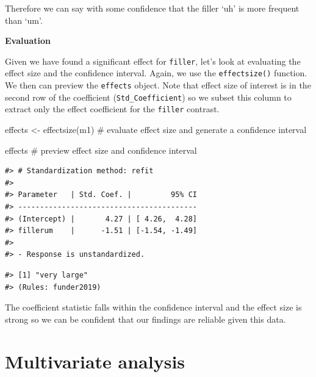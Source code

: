 \documentclass[
  letterpaper,
]{latex/krantz}
\newenvironment{Shaded}{\begin{snugshade}}{\end{snugshade}}
\newcommand{\CommentTok}[1]{\textcolor[rgb]{0.37,0.37,0.37}{#1}}
\newcommand{\DecValTok}[1]{\textcolor[rgb]{0.68,0.00,0.00}{#1}}
\newcommand{\FunctionTok}[1]{\textcolor[rgb]{0.28,0.35,0.67}{#1}}
\newcommand{\NormalTok}[1]{\textcolor[rgb]{0.00,0.23,0.31}{#1}}
\newcommand{\OtherTok}[1]{\textcolor[rgb]{0.00,0.23,0.31}{#1}}
\newcommand{\SpecialCharTok}[1]{\textcolor[rgb]{0.37,0.37,0.37}{#1}}
\begin{document}
Therefore we can say with some confidence that the filler `uh' is more
frequent than `um'.

\textbf{Evaluation}

Given we have found a significant effect for \texttt{filler}, let's look
at evaluating the effect size and the confidence interval. Again, we use
the \texttt{effectsize()} function. We then can preview the
\texttt{effects} object. Note that effect size of interest is in the
second row of the coefficient (\texttt{Std\_Coefficient}) so we subset
this column to extract only the effect coefficient for the
\texttt{filler} contrast.

\begin{Shaded}
\begin{Highlighting}[]
\NormalTok{effects }\OtherTok{\textless{}{-}} \FunctionTok{effectsize}\NormalTok{(m1) }\CommentTok{\# evaluate effect size and generate a confidence interval}

\NormalTok{effects }\CommentTok{\# preview effect size and confidence interval}
\end{Highlighting}
\end{Shaded}

\begin{verbatim}
#> # Standardization method: refit
#> 
#> Parameter   | Std. Coef. |         95% CI
#> -----------------------------------------
#> (Intercept) |       4.27 | [ 4.26,  4.28]
#> fillerum    |      -1.51 | [-1.54, -1.49]
#> 
#> - Response is unstandardized.
\end{verbatim}

\begin{Shaded}
\end{Shaded}

\begin{verbatim}
#> [1] "very large"
#> (Rules: funder2019)
\end{verbatim}

The coefficient statistic falls within the confidence interval and the
effect size is strong so we can be confident that our findings are
reliable given this data.

\hypertarget{multivariate-analysis}{%
\section{Multivariate analysis}\label{multivariate-analysis}}
\end{document}
